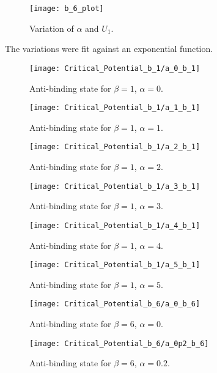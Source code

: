 \documentclass[twoclumn, a4, 11pt]{article}
\begin{document}
\begin{figure}[h!]
\centering
\texttt{[image: b\_6\_plot]}
\caption{Variation of $\alpha$ and $U_1$.}
\label{fig:b6plot}
\end{figure}

The variations were fit against an exponential function.

\pagebreak
\begin{figure}[t!]
\centering
\texttt{[image: Critical\_Potential\_b\_1/a\_0\_b\_1]}
\caption{Anti-binding state for $\beta = 1$, $\alpha = 0$.}
\label{fig:a0b1}
\end{figure}

\begin{figure}[t!]
	\centering
	\texttt{[image: Critical\_Potential\_b\_1/a\_1\_b\_1]}
	\caption{Anti-binding state for $\beta = 1$, $\alpha = 1$.}
	\label{fig:a1b1}
\end{figure}

\begin{figure}[t!]
	\centering
	\texttt{[image: Critical\_Potential\_b\_1/a\_2\_b\_1]}
	\caption{Anti-binding state for $\beta = 1$, $\alpha = 2$.}
	\label{fig:a2b1}
\end{figure}

\begin{figure}[t!]
	\centering
	\texttt{[image: Critical\_Potential\_b\_1/a\_3\_b\_1]}
	\caption{Anti-binding state for $\beta = 1$, $\alpha = 3$.}
	\label{fig:a3b1}
\end{figure}

\begin{figure}[t!]
	\centering
	\texttt{[image: Critical\_Potential\_b\_1/a\_4\_b\_1]}
	\caption{Anti-binding state for $\beta = 1$, $\alpha = 4$.}
	\label{fig:a4b1}
\end{figure}

\begin{figure}[t!]
	\centering
	\texttt{[image: Critical\_Potential\_b\_1/a\_5\_b\_1]}
	\caption{Anti-binding state for $\beta = 1$, $\alpha = 5$.}
	\label{fig:a5b1}
\end{figure}

\pagebreak
\begin{figure}[t!]
\centering
\texttt{[image: Critical\_Potential\_b\_6/a\_0\_b\_6]}
\caption{Anti-binding state for $\beta = 6$, $\alpha = 0$.}
\label{fig:a0b6}
\end{figure}

\begin{figure}[t!]
\centering
\texttt{[image: Critical\_Potential\_b\_6/a\_0p2\_b\_6]}
\caption{Anti-binding state for $\beta = 6$, $\alpha = 0.2$.}
\label{fig:a0p2b6}
\end{figure}
\end{document}
